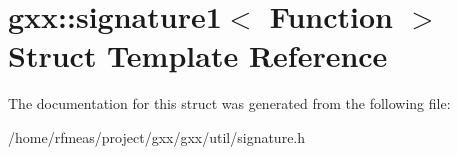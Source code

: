 \hypertarget{structgxx_1_1signature1}{}\section{gxx\+:\+:signature1$<$ Function $>$ Struct Template Reference}
\label{structgxx_1_1signature1}


The documentation for this struct was generated from the following file\+:\begin{DoxyCompactItemize}
\item 
/home/rfmeas/project/gxx/gxx/util/signature.\+h\end{DoxyCompactItemize}
